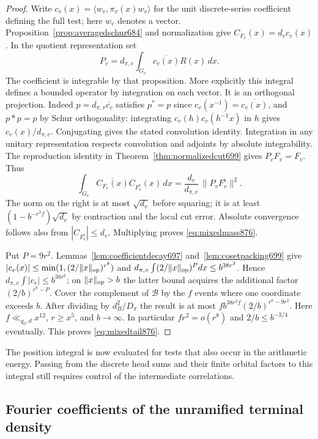\documentclass[a4paper,11pt]{article}
\theoremstyle{definition}
\theoremstyle{remark}
\numberwithin{equation}{section}
\begin{document}
\begin{proof}
Write \(c_v(x)=\langle w_v,\pi_v(x)w_v\rangle\) for the unit
discrete-series coefficient defining the full test; here \(w_v\)
denotes a vector. Proposition~\ref{prop:averagedschur684} and
normalization give \(C_{F_v}(x)=d_v c_v(x)\). In the quotient
representation set
\[
             P_v=d_{\pi,v}\int_{G_v}\overline{c_v(x)}R(x)\,dx .
\]
The coefficient is integrable by that proposition. More explicitly
this integral defines a bounded operator by integration on each
vector. It is an orthogonal projection. Indeed
\(p=d_{\pi,v}\overline{c_v}\) satisfies \(p^*=p\) since
\(c_v(x^{-1})=\overline{c_v(x)}\), and \(p*p=p\) by Schur
orthogonality: integrating \(c_v(h)c_v(h^{-1}x)\) in \(h\) gives
\(c_v(x)/d_{\pi,v}\). Conjugating gives the stated convolution
identity. Integration in any unitary representation respects
convolution and adjoints by absolute integrability.
The reproduction identity in Theorem~\ref{thm:normalizedcut699}
gives \(P_vF_v=F_v\). Thus
\[
 \int_{G_v}\overline{C_{F_v}(x)}C_{F_v^\flat}(x)\,dx
       =\frac{d_v}{d_{\pi,v}}\,\|P_vF_v^\flat\|^2.
\]
The norm on the right is at most \(\sqrt{d_v}\) before squaring;
it is at least \((1-b^{-r^3f})\sqrt{d_v}\) by contraction and
the local cut error. Absolute convergence follows also from
\(|C_{F_v^\flat}|\le d_v\). Multiplying proves
\eqref{eq:mixedmass876}.

Put \(P=9r^2\). Lemmas~\ref{lem:coefficientdecay697}
and~\ref{lem:cosetpacking699} give
\(|c_v(x)|\le\min(1,(2/\|x\|_{\rm op})^{r^8})\) and
\(d_{\pi,v}\int (2/\|x\|_{\rm op})^Pdx\le b^{38r^2}\).
Hence \(d_{\pi,v}\int |c_v|\le b^{38r^2}\); on \(\|x\|_{\rm op}>b\)
the latter bound acquires the additional factor \((2/b)^{r^8-P}\).
Cover the complement of \(\mathcal B\) by the \(f\) events where
one coordinate exceeds \(b\). After dividing by \(d_B^2/D_\pi\)
the result is at most \(f b^{38r^2 f}(2/b)^{r^8-9r^2}\).
Here \(f\ll_{q_0,d}x^{12}\), \(r\ge x^5\), and \(b\to\infty\).
In particular \(fr^2=o(r^8)\) and \(2/b\le b^{-3/4}\) eventually.
This proves \eqref{eq:mixedtail876}.
\end{proof}

The position integral is now evaluated for tests that also occur
in the arithmetic energy. Passing from the discrete head sums and
their finite orbital factors to this integral still requires control
of the intermediate correlations.
\clearpage

\subsection{Fourier coefficients of the unramified terminal density}
\label{sec:terminalfourier877}
\end{document}
